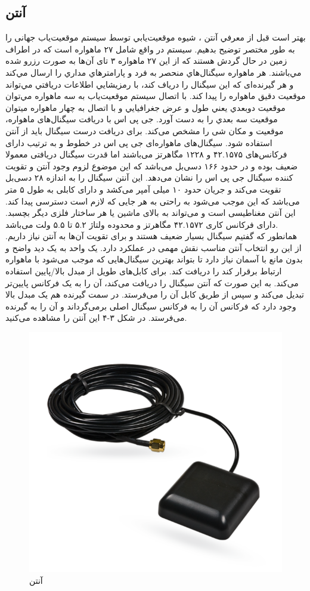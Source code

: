 \subsection{آنتن }
بهتر است قبل از معرفي آنتن ، شيوه موقعيت‌يابي توسط سيستم موقعیت‌یاب جهانی  را به طور مختصر توضيح بدهيم. سيستم  در واقع شامل ۲۷ ماهواره است كه در اطراف زمين در حال گردش هستند كه از اين ۲۷ ماهواره ۳ تای آن‌ها به صورت رزرو شده مي‌باشند. هر ماهواره سيگنال‌هاي منحصر به فرد و پارامترهاي مداري را ارسال مي‌كند و هر گیرنده‌ای كه اين سيگنال را درياف كند، با رمزيشايي اطلاعات دريافتي مي‌تواند موقعيت دقيق ماهواره را پيدا كند. با اتصال سيستم موقعيت‌ياب به سه ماهواره مي‌توان موقعيت دوبعدي يعني طول و عرض جغرافيايي و با اتصال به چهار ماهواره ميتوان موقعيت سه بعدي را به دست آورد.
جی پی اس با دریافت سیگنال‌های ماهواره، موقعیت و مکان شی را مشخص می‌کند. برای دریافت درست سیگنال باید از آنتن استفاده شود. سیگنال‌های ماهواره‌ای جی پی اس در خطوط  و  به ترتیب دارای فرکانس‌های ۴۲.۱۵۷۵ و ۱۲۲۸ مگاهرتز می‌باشند اما قدرت سیگنال دریافتی معمولا ضعیف بوده و در حدود ۱۶۶ دسی‌بل می‌باشد که این موضوع لزوم وجود آنتن و تقویت کننده سیگنال جی پی اس را نشان می‌دهد. این آنتن سیگنال را به اندازه ۲۸ دسی‌بل تقویت می‌کند و جریان حدود ۱۰ میلی آمپر می‌کشد و دارای کابلی به طول ۵ متر می‌باشد که این موجب می‌شود به راحتی به هر جایی که لازم است دسترسی پیدا کند. این آنتن مغناطیسی است و می‌تواند به بالای ماشین یا هر ساختار فلزی دیگر بچسبد. دارای فرکانس کاری ۴۲.۱۵۷۲ مگاهرتز و محدوده ولتاژ ۵.۲ تا ۵.۵ ولت می‌باشد.
\\


همانطور که گفتیم سیگنال  بسیار ضعیف هستند و برای تقویت آن‌ها به آنتن نیاز داریم. از این رو انتخاب آنتن مناسب نقش مهمی در عملکرد  دارد. یک واحد  به یک دید واضح و بدون مانع با آسمان نیاز دارد تا بتواند بهترین سیگنال‌هایی که موجب می‌شود با ماهواره ارتباط برقرار کند را دریافت کند.  برای کابل‌های طویل از مبدل بالا/پایین استفاده می‌کند. به این صورت که آنتن سیگنال  را دریافت می‌کند، آن را به یک فرکانس پایین‌تر تبدیل می‌کند و سپس از طریق کابل  آن را می‌فرستد. در سمت گیرنده  هم یک مبدل بالا وجود دارد که فرکانس آن را به فرکانس سیگنال اصلی برمی‌گرداند و آن را به گیرنده  می‌فرستد.
در شکل ۳-۴ این آنتن را مشاهده می‌کنید.
\begin{figure}[!h]
	\centerline{\includegraphics[width=.5\textwidth]{gps-antanna}}
	\caption{آنتن }
\end{figure}
